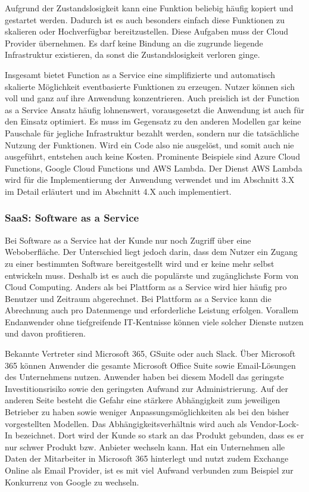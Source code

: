    Aufgrund der Zustandslosigkeit kann eine Funktion beliebig häufig kopiert und gestartet werden.
   Dadurch ist es auch besonders einfach diese Funktionen zu skalieren oder Hochverfügbar bereitzustellen. Diese Aufgaben muss der Cloud Provider übernehmen.
   Es darf keine Bindung an die zugrunde liegende Infrastruktur existieren, da sonst die Zustandslosigkeit verloren ginge.

   Insgesamt bietet Function as a Service eine simplifizierte und automatisch skalierte Möglichkeit eventbasierte Funktionen zu erzeugen.
   Nutzer können sich voll und ganz auf ihre Anwendung konzentrieren.
   Auch preislich ist der Function as a Service Ansatz häufig lohnenswert, vorausgesetzt die Anwendung ist auch für den Einsatz optimiert.
   Es muss im Gegensatz zu den anderen Modellen gar keine Pauschale für
   jegliche Infrastruktur bezahlt werden, sondern nur die tatsächliche Nutzung der Funktionen. Wird ein Code also nie ausgelöst, und somit auch nie ausgeführt,
   entstehen auch keine Kosten.
   Prominente Beispiele sind Azure Cloud Functions, Google Cloud Functions und AWS Lambda.
   Der Dienst AWS Lambda wird für die Implementierung der Anwendung verwendet und im Abschnitt 3.X im Detail erläutert und im Abschnitt 4.X auch
   implementiert.\cite[]{AWSWhitepaper}

   \subsubsection{SaaS: Software as a Service}
   Bei Software as a Service hat der Kunde nur noch Zugriff über eine Weboberfläche. Der Unterschied liegt jedoch darin, dass dem Nutzer
   ein Zugang zu einer bestimmten Software bereitgestellt wird und er keine mehr selbst entwickeln muss. Deshalb ist es auch die populärste und
   zugänglichste Form von Cloud Computing. Anders als bei Plattform as a Service wird hier häufig pro Benutzer und Zeitraum abgerechnet. Bei Plattform
   as a Service kann die Abrechnung auch pro Datenmenge und erforderliche Leistung erfolgen.
   Vorallem Endanwender ohne tiefgreifende IT-Kentnisse können viele solcher Dienste nutzen und davon profitieren. \cite[]{SaaS}

   Bekannte Vertreter sind Microsoft 365, GSuite oder auch Slack. Über Microsoft 365 können Anwender die gesamte Microsoft Office Suite sowie Email-Lösungen des Unternehmens nutzen.
   Anwender haben bei diesem Modell das geringste Investitionsrisiko sowie den geringsten
   Aufwand zur Administrierung. Auf der anderen Seite besteht die Gefahr eine stärkere Abhängigkeit zum jeweiligen Betrieber zu haben sowie weniger Anpassungsmöglichkeiten als bei den bisher vorgestellten
   Modellen.
   Das Abhängigkeitsverhältnis wird auch als Vendor-Lock-In bezeichnet. Dort wird der Kunde so stark an das Produkt gebunden, dass es er nur schwer
   Produkt bzw. Anbieter wechseln kann.
   Hat ein Unternehmen alle Daten der Mitarbeiter in Microsoft 365 hinterlegt und nutzt zudem Exchange Online als Email Provider, ist es mit viel Aufwand verbunden
   zum Beispiel zur Konkurrenz von Google zu wechseln.



